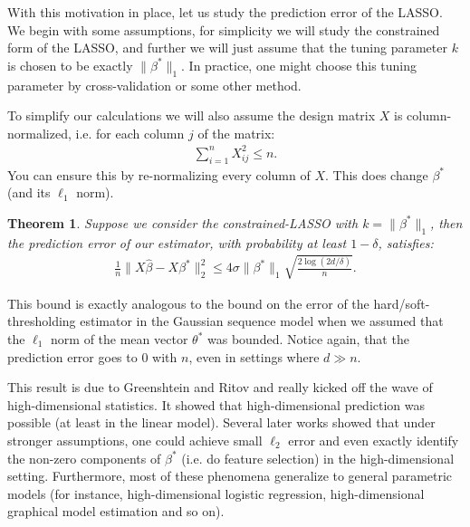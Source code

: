 \documentclass[twoside,12pt]{article}
\newcounter{lecnum}
\newtheorem{theorem}{Theorem}[lecnum]
\begin{document}
With this motivation in place, let us study the prediction error of the LASSO. We begin with some assumptions, for simplicity we will study the constrained form of the LASSO, and further we will just assume that the tuning parameter $k$ is chosen to be exactly $\|\beta^*\|_1$. In practice, one might choose this tuning parameter by cross-validation or some other method.  

To simplify our calculations we will also assume the design matrix $X$ is column-normalized, i.e. for each column $j$ of the matrix:
\begin{align*}
\sum_{i=1}^n X_{ij}^2 \leq n.
\end{align*}
You can ensure this by re-normalizing every column of $X$. This does change $\beta^*$ (and its $\ell_1$ norm). 

\begin{theorem}
Suppose we consider the constrained-LASSO with $k =\|\beta^*\|_1$, then the prediction error of our estimator, with probability at least $1 - \delta$, satisfies:
\begin{align*}
\frac{1}{n} \| X\widehat{\beta} - X\beta^*\|_2^2 \leq 4 \sigma \|\beta^*\|_1 \sqrt{\frac{2 \log(2d/\delta)}{n}}.
\end{align*}
\end{theorem}
This bound is exactly analogous to the bound on the error of the hard/soft-thresholding estimator in the Gaussian sequence model when we assumed that the $\ell_1$ norm of the mean vector $\theta^*$ was bounded. Notice again, that the prediction error goes to 0 with $n$, even in settings where $d \gg n$.

This result is due to Greenshtein and Ritov and really kicked off the wave of high-dimensional statistics. It showed that high-dimensional prediction was possible (at least in the linear model). Several later works showed that under stronger assumptions, one could achieve small $\ell_2$ error and even exactly identify the non-zero components of $\beta^*$ (i.e. do feature selection) in the high-dimensional setting. Furthermore, most of these phenomena generalize to general parametric models (for instance, high-dimensional logistic regression, high-dimensional graphical model estimation and so on).
\end{document}
